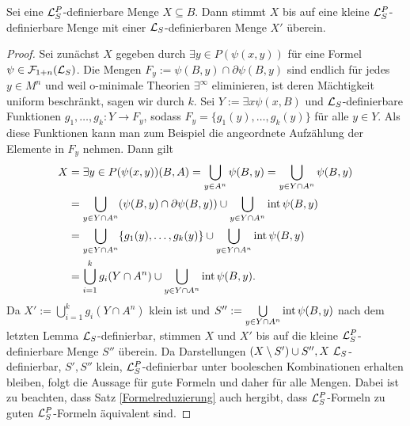 \begin{theorem}
	Sei eine $\mathcal{L}^P_S$-definierbare Menge $X\subseteq B$. Dann stimmt $X$ bis auf eine kleine $\mathcal{L}^P_S$-definierbare Menge mit einer $\mathcal{L}_S$-definierbaren Menge $X'$ überein.
\end{theorem}
\begin{proof}
	Sei zunächst $X$ gegeben durch $\exists y\in P(\psi(x,y))$ für eine Formel $\psi\in\mathcal{F}_{1+n}(\mathcal{L}_S)$. Die Mengen $F_y:=\psi(B,y)\cap\partial\psi(B,y)$ sind endlich für jedes $y\in M^n$ und weil o-minimale Theorien $\exists^\infty$ eliminieren, ist deren Mächtigkeit uniform beschränkt, sagen wir durch $k$. Sei $Y:=\exists x\psi(x,B)$ und $\mathcal{L}_S$-definierbare Funktionen $g_1,\dots,g_k:Y\rightarrow F_y$, sodass $F_y=\{g_1(y),\dots,g_k(y)\}$ für alle $y\in Y$. Als diese Funktionen kann man zum Beispiel die angeordnete Aufzählung der Elemente in $F_y$ nehmen. Dann gilt
	\begin{align*}
	X&=\exists y\in P(\psi(x,y))(B,A)=\bigcup\limits_{y\in A^n}\psi(B,y)=\bigcup\limits_{y\in Y\cap A^n}\psi(B,y)\\&=\bigcup\limits_{y\in Y\cap A^n}(\psi(B,y)\cap \partial\psi(B,y))\cup\bigcup\limits_{y\in Y\cap A^n}\operatorname{int}\psi(B,y)\\&=\bigcup\limits_{y\in Y\cap A^n}\{g_1(y),\dots,g_k(y)\}\cup\bigcup\limits_{y\in Y\cap A^n}\operatorname{int}\psi(B,y)\\&=\bigcup\limits_{i=1}^kg_i(Y\cap A^n)\cup \bigcup\limits_{y\in Y\cap A^n}\operatorname{int}\psi(B,y).
	\end{align*}
	Da $X':=\bigcup\limits_{i=1}^kg_i(Y\cap A^n)$ klein ist und $S'':=\bigcup\limits_{y\in Y\cap A^n}\operatorname{int}\psi(B,y)$ nach dem letzten Lemma $\mathcal{L}_S$-definierbar, stimmen $X$ und $X'$ bis auf die kleine $\mathcal{L}^P_S$-definierbare Menge $S''$ überein. Da Darstellungen \glqq{}$(X\setminus  S')\cup S'',X\ \lingua_S$-definierbar, $S',S''$ klein, $\mathcal{L}^P_S$-definierbar\grqq{} unter booleschen Kombinationen erhalten bleiben, folgt die Aussage für gute Formeln und daher für alle Mengen. Dabei ist zu beachten, dass Satz \ref{Formelreduzierung} auch hergibt, dass $\mathcal{L}^P_S$-Formeln zu guten $\mathcal{L}^P_S$-Formeln äquivalent sind.
\end{proof}


